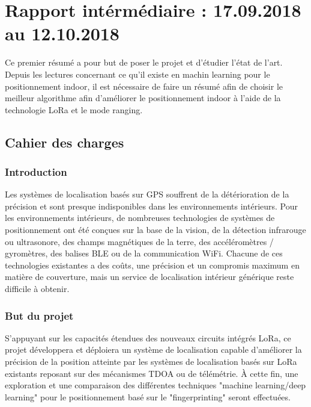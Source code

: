 \chapter{Rapport intérmédiaire : 17.09.2018 au 12.10.2018}

Ce premier résumé a pour but de poser le projet et d'étudier l'état de l'art. Depuis les lectures concernant ce qu'il existe en machin learning pour le positionnement indoor, il est nécessaire de faire un résumé afin de choisir le meilleur algorithme afin d'améliorer le positionnement indoor à l'aide de la technologie LoRa et le mode ranging.

\section{Cahier des charges}
\subsection{Introduction}
Les systèmes de localisation basés sur GPS souffrent de la détérioration de la précision et sont presque indisponibles dans les environnements intérieurs. Pour les environnements intérieurs, de nombreuses technologies de systèmes de positionnement ont été conçues sur la base de la vision, de la détection infrarouge ou ultrasonore, des champs magnétiques de la terre, des accéléromètres / gyromètres, des balises BLE ou de la communication WiFi. Chacune de ces technologies existantes a des coûts, une précision et un compromis maximum en matière de couverture, mais un service de localisation intérieur générique reste difficile à obtenir.

\subsection{But du projet}
S'appuyant sur les capacités étendues des nouveaux circuits intégrés LoRa, ce projet développera et déploiera un système de localisation capable d'améliorer la précision de la position atteinte par les systèmes de localisation basés sur LoRa existants reposant sur des mécanismes TDOA ou de télémétrie. À cette fin, une exploration et une comparaison des différentes techniques "machine learning/deep learning" pour le positionnement basé sur le "fingerprinting" seront effectuées.


